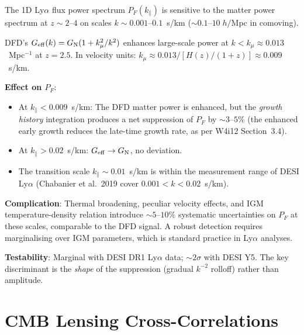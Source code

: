 \documentclass[11pt,a4paper]{article}
\newcounter{findingctr}
\newenvironment{finding}[1][]{%
  \refstepcounter{findingctr}%
  \begin{tcolorbox}[colback=blue!3!white, colframe=blue!50!black,
    title=\textbf{Finding \thefindingctr: #1}]
}{%
  \end{tcolorbox}%
}
\newcommand{\GN}{G_{\rm N}}
\newcommand{\Geff}{G_{\rm eff}}
\newcommand{\kmu}{k_\mu}
\begin{document}
\begin{finding}[\textbf{NEW}: DFD Imprint on Ly$\alpha$ Flux Power at
  $k_\parallel < 0.01$~s/km]
\label{find:lya}

The 1D Ly$\alpha$ flux power spectrum $P_F(k_\parallel)$ is sensitive
to the matter power spectrum at $z \sim 2$--$4$ on scales
$k \sim 0.001$--$0.1$~s/km ($\sim 0.1$--$10\;h/$Mpc in comoving).

DFD's $\Geff(k) = \GN(1 + \kmu^2/k^2)$ enhances large-scale power
at $k < \kmu \approx 0.013$~Mpc$^{-1}$ at $z = 2.5$.  In velocity
units: $k_\mu \approx 0.013/[H(z)/(1+z)] \approx 0.009$~s/km.

\textbf{Effect on $P_F$}:
\begin{itemize}[nosep]
\item At $k_\parallel < 0.009$~s/km: The DFD matter power is
  enhanced, but the \emph{growth history} integration produces a
  net suppression of $P_F$ by $\sim 3$--$5\%$ (the enhanced early
  growth reduces the late-time growth rate, as per W4i12
  Section~3.4).
\item At $k_\parallel > 0.02$~s/km: $\Geff \to \GN$, no deviation.
\item The transition scale $k_\parallel \sim 0.01$~s/km is within
  the measurement range of DESI Ly$\alpha$ (Chabanier et al.\ 2019
  cover $0.001 < k < 0.02$~s/km).
\end{itemize}

\textbf{Complication}: Thermal broadening, peculiar velocity effects,
and IGM temperature-density relation introduce $\sim 5$--$10\%$
systematic uncertainties on $P_F$ at these scales, comparable to the
DFD signal.  A robust detection requires marginalising over IGM
parameters, which is standard practice in Ly$\alpha$ analyses.

\textbf{Testability}: Marginal with DESI DR1 Ly$\alpha$ data;
$\sim 2\sigma$ with DESI Y5.  The key discriminant is the
\emph{shape} of the suppression (gradual $k^{-2}$ rolloff) rather
than amplitude.

\end{finding}


\section{CMB Lensing Cross-Correlations}
\label{sec:new-cmblensing}
\end{document}
